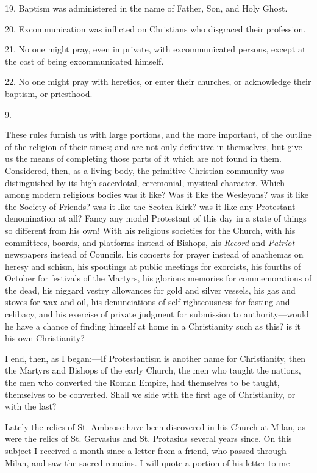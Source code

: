 19. Baptism was administered in the name of Father, Son, and Holy
Ghost.

20. Excommunication was inflicted on Christians who disgraced their
profession.

21. No one might pray, even in private, with excommunicated
persons, except at the cost of being excommunicated himself.

22. No one might pray with heretics, or enter their churches, or
acknowledge their baptism, or priesthood.

9.

These rules furnish us with large portions, and the more
important, of the outline of the religion of their times; and are not
only definitive in themselves, but give us the means of completing
those parts of it which are not found in them. Considered, then, as a
living body, the primitive Christian community was distinguished by
its high sacerdotal, ceremonial, mystical character. Which among
modern religious bodies was it like? Was it like the Wesleyans? was it
like the Society of Friends? was it like the Scotch Kirk? was it like
any Protestant denomination at all? Fancy any model Protestant of this
day in a state of things so different from his own! With his religious
societies for the Church, with his committees, boards, and platforms
instead of Bishops, his \emph{Record} and \emph{Patriot} newspapers
instead of Councils, his concerts for prayer instead of anathemas on
heresy and schism, his spoutings at public meetings for exorcists, his
fourths of October for festivals of the Martyrs, his glorious memories
for commemorations of the dead, his niggard vestry allowances for gold
and silver vessels, his gas and stoves for wax and oil, his
denunciations of self-righteousness for fasting and celibacy, and his
exercise of private judgment for submission to authority—would he
have a chance of finding himself at home in a Christianity such as
this? is it his own Christianity?

I end, then, as I began:—If Protestantism is another name for
Christianity, then the Martyrs and Bishops of the early Church, the
men who taught the nations, the men who converted the Roman Empire,
had themselves to be taught, themselves to be converted. Shall we side
with the first age of Christianity, or with the last?


Lately the relics of St. Ambrose have been discovered in his
Church at Milan, as were the relics of St. Gervasius and St. Protasius
several years since. On this subject I received a month since a letter
from a friend, who passed through Milan, and saw the sacred remains. I
will quote a portion of his letter to me—

